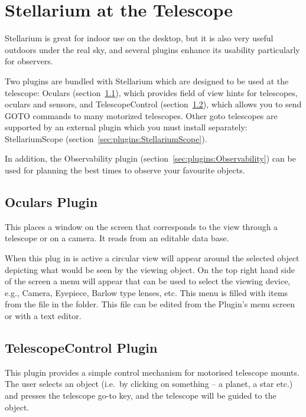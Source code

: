 \chapter{Stellarium at the Telescope}
\label{ch:atTheTelescope}

Stellarium is great for indoor use on the desktop, but it is also very
useful outdoors under the real sky, and several plugins enhance its
usability particularly for observers.

Two plugins are bundled with Stellarium which are designed to be used
at the telescope: Oculars (section~\ref{sec:plugins:Oculars}), which
provides field of view hints for telescopes, oculars and sensors, and
TelescopeControl (section~\ref{sec:plugins:TelescopeControl}), which
allows you to send GOTO commands to many motorized telescopes. Other
goto telescopes are supported by an external plugin which you must
install separately: StellariumScope
(section~\ref{sec:plugins:StellariumScope}).

In addition, the Observability plugin (section~\ref{sec:plugins:Observability})
can be used for planning the best times to observe your favourite
objects.

\section{Oculars Plugin}
\label{sec:plugins:Oculars}

This places a window on the screen that corresponds to the view
through a telescope or on a camera. It reads from an editable data
base.

When this plug in is active a circular view will appear around the
selected object depicting what would be seen by the viewing object. On
the top right hand side of the screen a menu will appear that can be
used to select the viewing device, e.g., Camera, Eyepiece, Barlow type
lenses, etc. This menu is filled with items from the 
file in the  folder. This file can be edited
from the Plugin's menu screen or with a text editor.


\newpage
\section{TelescopeControl Plugin}
\label{sec:plugins:TelescopeControl}

This plugin provides a simple control mechanism for motorised
telescope mounts. The user selects an object (i.e.\ by clicking on
something -- a planet, a star etc.) and presses the telescope go-to
key, and the telescope will be guided to the object.

